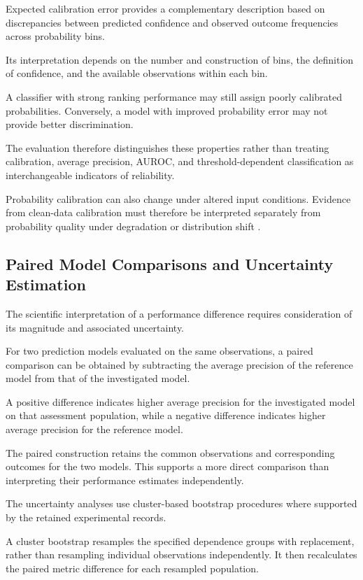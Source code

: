 Expected calibration error provides a complementary description based on discrepancies between predicted confidence and observed outcome frequencies across probability bins.

Its interpretation depends on the number and construction of bins, the definition of confidence, and the available observations within each bin.

A classifier with strong ranking performance may still assign poorly calibrated probabilities. Conversely, a model with improved probability error may not provide better discrimination.

The evaluation therefore distinguishes these properties rather than treating calibration, average precision, AUROC, and threshold-dependent classification as interchangeable indicators of reliability.

Probability calibration can also change under altered input conditions. Evidence from clean-data calibration must therefore be interpreted separately from probability quality under degradation or distribution shift \parencite{P008}.

\subsection{Paired Model Comparisons and Uncertainty Estimation}

The scientific interpretation of a performance difference requires consideration of its magnitude and associated uncertainty.

For two prediction models evaluated on the same observations, a paired comparison can be obtained by subtracting the average precision of the reference model from that of the investigated model.

A positive difference indicates higher average precision for the investigated model on that assessment population, while a negative difference indicates higher average precision for the reference model.

The paired construction retains the common observations and corresponding outcomes for the two models. This supports a more direct comparison than interpreting their performance estimates independently.

The uncertainty analyses use cluster-based bootstrap procedures where supported by the retained experimental records.

A cluster bootstrap resamples the specified dependence groups with replacement, rather than resampling individual observations independently. It then recalculates the paired metric difference for each resampled population.

